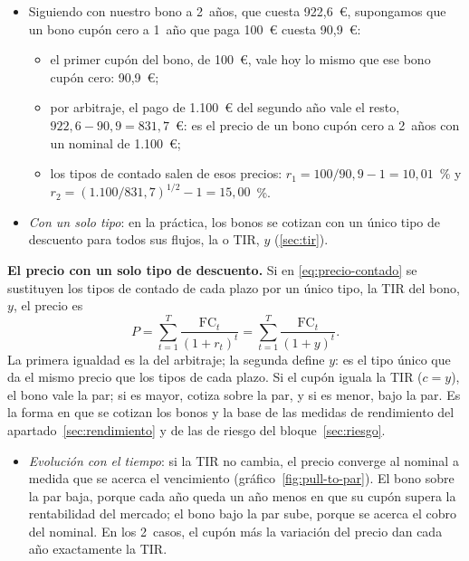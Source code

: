 \documentclass[11pt]{article}
\begin{document}
\begin{itemize}
\item Siguiendo con nuestro bono a 2~años, que cuesta 922,6~€, supongamos que un bono cupón cero a 1~año que paga 100~€ cuesta 90,9~€:
  \begin{itemize}
  \item el primer cupón del bono, de 100~€, vale hoy lo mismo que ese bono cupón cero: 90,9~€;
  \item por arbitraje, el pago de 1.100~€ del segundo año vale el resto, $922{,}6-90{,}9=831{,}7$~€: es el precio de un bono cupón cero a 2~años con un nominal de 1.100~€;
  \item los tipos de contado salen de esos precios: $r_1=100/90{,}9-1=10{,}01$~\% y $r_2=(1.100/831{,}7)^{1/2}-1=15{,}00$~\%.
  \end{itemize}
\item \emph{Con un solo tipo}: en la práctica, los bonos se cotizan con un único tipo de descuento para todos sus flujos, la  o TIR, $y$ (\ref{sec:tir}).
\end{itemize}

\begin{anotaciones}
\textbf{El precio con un solo tipo de descuento.} Si en \eqref{eq:precio-contado} se sustituyen los tipos de contado de cada plazo por un único tipo, la TIR del bono, $y$, el precio es
\begin{equation}\label{eq:precio-bono}
P=\sum_{t=1}^{T}\frac{\mathrm{FC}_t}{(1+r_t)^t}=\sum_{t=1}^{T}\frac{\mathrm{FC}_t}{(1+y)^t} .
\end{equation}
La primera igualdad es la del arbitraje; la segunda define $y$: es el tipo único que da el mismo precio que los tipos de cada plazo. Si el cupón iguala la TIR ($c=y$), el bono vale la par; si es mayor, cotiza sobre la par, y si es menor, bajo la par. Es la forma en que se cotizan los bonos y la base de las medidas de rendimiento del apartado~\ref{sec:rendimiento} y de las de riesgo del bloque~\ref{sec:riesgo}.
\end{anotaciones}

\begin{itemize}
\item \emph{Evolución con el tiempo}: si la TIR no cambia, el precio converge al nominal a medida que se acerca el vencimiento (gráfico~\ref{fig:pull-to-par}). El bono sobre la par baja, porque cada año queda un año menos en que su cupón supera la rentabilidad del mercado; el bono bajo la par sube, porque se acerca el cobro del nominal. En los 2~casos, el cupón más la variación del precio dan cada año exactamente la TIR.
\end{itemize}
\end{document}
